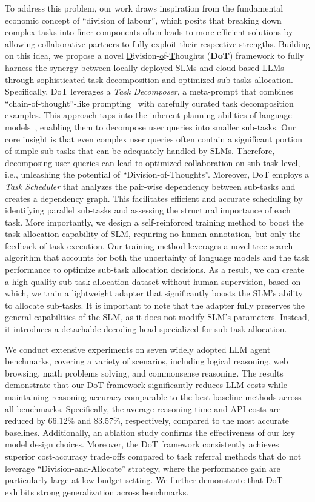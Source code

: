 To address this problem, our work draws inspiration from the fundamental economic concept of ``division of labour'', which posits that breaking down complex tasks into finer components often leads to more efficient solutions by allowing collaborative partners to fully exploit their respective strengths. Building on this idea, we propose a novel \underline{D}ivision-\underline{o}f-\underline{T}houghts (\textbf{DoT}) framework to fully harness the synergy between locally deployed SLMs and cloud-based LLMs through sophisticated task decomposition and optimized sub-tasks allocation. Specifically, DoT leverages a \emph{Task Decomposer}, a meta-prompt that combines ``chain-of-thought''-like prompting~\cite{wei2022chain} with carefully curated task decomposition examples. This approach taps into the inherent planning abilities of language models~\cite{song2023llm}, enabling them to decompose user queries into smaller sub-tasks. Our core insight is that even complex user queries often contain a significant portion of simple sub-tasks that can be adequately handled by SLMs. Therefore, decomposing user queries can lead to optimized collaboration on sub-task level, i.e., unleashing the potential of “Division-of-Thoughts”. Moreover, DoT employs a \emph{Task Scheduler} that analyzes the pair-wise dependency between sub-tasks and creates a dependency graph. This facilitates efficient and accurate scheduling by identifying parallel sub-tasks and assessing the structural importance of each task. More importantly, we design a self-reinforced training method to boost the task allocation capability of SLM, requiring no human annotation, but only the feedback of task execution. Our training method leverages a novel tree search algorithm that accounts for both the uncertainty of language models and the task performance to optimize sub-task allocation decisions. As a result, we can create a high-quality sub-task allocation dataset without human supervision, based on which, we train a lightweight adapter that significantly boosts the SLM's ability to allocate sub-tasks. It is important to note that the adapter fully preserves the general capabilities of the SLM, as it does not modify SLM's parameters. Instead, it introduces a detachable decoding head specialized for sub-task allocation.   




We conduct extensive experiments on seven widely adopted LLM agent benchmarks, covering a variety of scenarios, including logical reasoning, web browsing, math problems solving, and commonsense reasoning. The results demonstrate that our DoT framework significantly reduces LLM costs while maintaining reasoning accuracy comparable to the best baseline methods across all benchmarks. Specifically, the average reasoning time and API costs are reduced by 66.12\% and 83.57\%, respectively, compared to the most accurate baselines. Additionally, an ablation study confirms the effectiveness of our key model design choices. Moreover, the DoT framework consistently achieves superior cost-accuracy trade-offs compared to task referral methods that do not leverage ``Division-and-Allocate'' strategy, where the performance gain are particularly large at low budget setting. We further demonstrate that DoT exhibits strong generalization across benchmarks.


